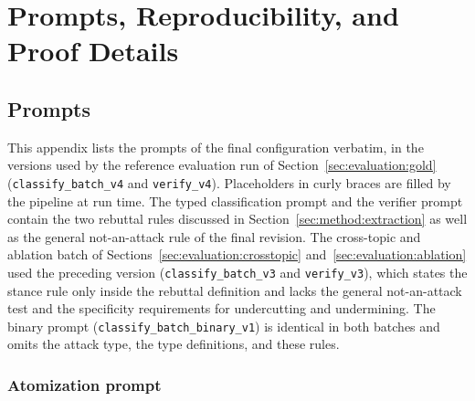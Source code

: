 %
\chapter{Prompts, Reproducibility, and Proof Details}
\label{sec:appendix}

\section{Prompts}
\label{sec:appendix:prompts}

This appendix lists the prompts of the final configuration verbatim, in
the versions used by the reference evaluation run of
Section~\ref{sec:evaluation:gold} (\texttt{classify\_batch\_v4} and
\texttt{verify\_v4}). Placeholders in curly braces are filled by the pipeline
at run time. The typed classification prompt and the verifier prompt contain
the two rebuttal rules discussed in Section~\ref{sec:method:extraction} as
well as the general not-an-attack rule of the final revision. The cross-topic
and ablation batch of Sections~\ref{sec:evaluation:crosstopic}
and~\ref{sec:evaluation:ablation} used the preceding version
(\texttt{classify\_batch\_v3} and \texttt{verify\_v3}), which states the
stance rule only inside the rebuttal definition and lacks the general
not-an-attack test and the specificity requirements for undercutting and
undermining. The binary prompt (\texttt{classify\_batch\_binary\_v1}) is
identical in both batches and omits the
attack type, the type definitions, and these rules.

\subsection*{Atomization prompt}

